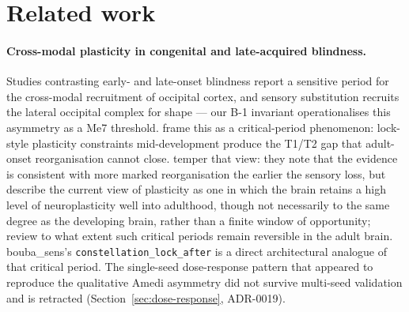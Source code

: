 \documentclass{article}
\begin{document}

\section{Related work}
\label{sec:related}

\paragraph{Cross-modal plasticity in congenital and late-acquired blindness.}
Studies contrasting early- and late-onset blindness
\citep{cohen1999period, sadato2002critical, collignon2013impact} report a sensitive period for the
cross-modal recruitment of occipital cortex, and sensory
substitution recruits the lateral occipital complex for shape
\citep{amedi2007} ---
our B-1 invariant operationalises this asymmetry as a Me7
threshold. \citet{bavelier2002cross} frame this as a critical-period
phenomenon: lock-style plasticity constraints mid-development
produce the T1/T2 gap that adult-onset reorganisation cannot
close. \citet{merabet2010neural} temper that view: they note
that the evidence is consistent with more marked reorganisation
the earlier the sensory loss, but describe the current view of
plasticity as one in which the brain retains a high level of
neuroplasticity well into adulthood, though not necessarily to
the same degree as the developing brain, rather than a finite
window of opportunity;
\citet{heimler2020critical} review to what extent such
critical periods remain reversible in the adult brain.
bouba\_sens's \texttt{constellation\_lock\_after} is a direct
architectural analogue of that critical period. The single-seed
dose-response pattern that appeared to reproduce the qualitative
Amedi asymmetry did not survive multi-seed validation and is
retracted (Section~\ref{sec:dose-response}, ADR-0019).
\end{document}
